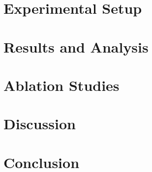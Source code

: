 \documentclass[preprint,review,number]{elsarticle}
\begin{document}
\section{Experimental Setup}
\label{sec:setup}



\section{Results and Analysis}
\label{sec:results}



\section{Ablation Studies}
\label{sec:ablation}



\section{Discussion}
\label{sec:discussion}



\section{Conclusion}
\label{sec:conclusion}




\end{document}
